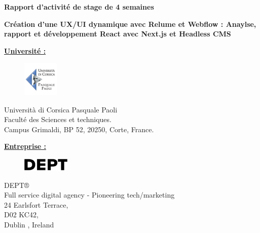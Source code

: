 \vspace*{1cm}

\textbf{\Large Rapport d'activité de stage de 4 semaines}
\vspace*{0.8cm}

\textbf{Création d'une UX/UI dynamique avec Relume et Webflow : Anaylse, rapport et développement React avec Next.js et Headless CMS}
\vspace*{1cm}

\textbf{\underline{\Large Université :}}

\begin{figure}[h]
\includegraphics[width=0.15\textwidth]{Includes/Images/universitedecorse.png} 
\end{figure}

\begin{flushleft}
    \hspace{1cm} Università di Corsica Pasquale Paoli \\
    \hspace{1cm} Faculté des Sciences et techniques.\\
    \hspace{1cm} Campus Grimaldi, BP 52, 20250, Corte, France.\\
\end{flushleft}
\vspace{0.8cm}


\textbf{\underline{\Large Entreprise :}}

\begin{figure}[h] 
\includegraphics[width=0.2\textwidth]{Includes/Images/Dept_Marketplaces_Logo.png} 
\end{figure}

\begin{flushleft}
    \hspace{1cm} DEPT® \\
    \hspace{1cm} Full service digital agency - Pioneering tech/marketing \\
    \hspace{1cm} 24 Earlsfort Terrace,\\
    \hspace{1cm} D02 KC42, \\
    \hspace{1cm} Dublin , Ireland \\
\end{flushleft}
\vspace{0.8cm}


